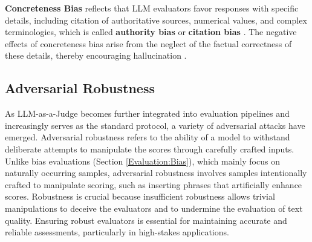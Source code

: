 \documentclass[acmsmall,screen]{acmart}
\begin{document}
\textbf{Concreteness Bias} reflects that LLM evaluators favor responses with specific details, including citation of authoritative sources, numerical values, and complex terminologies, which is called \textbf{authority bias} \cite{offsetbias} or \textbf{citation bias} \cite{chen2024humans,ye2024justice}.
The negative effects of concreteness bias arise from the neglect of the factual correctness of these details, thereby encouraging hallucination \citep{agrawal2023language}.


\subsection{Adversarial Robustness}
\label{Evaluation:Robustness}
As LLM-as-a-Judge becomes further integrated into evaluation pipelines and increasingly serves as the standard protocol, a variety of adversarial attacks have emerged.
Adversarial robustness refers to the ability of a model to withstand deliberate attempts to manipulate the scores through carefully crafted inputs.
Unlike bias evaluations (Section \ref{Evaluation:Bias}), which mainly focus on naturally occurring samples, adversarial robustness involves samples intentionally crafted to manipulate scoring, such as inserting phrases that artificially enhance scores. 
Robustness is crucial because insufficient robustness allows trivial manipulations to deceive the evaluators and to undermine the evaluation of text quality. 
Ensuring robust evaluators is essential for maintaining accurate and reliable assessments, particularly in high-stakes applications.
\end{document}
